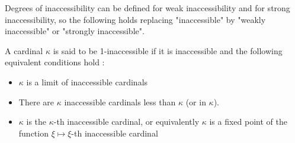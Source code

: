 \documentclass[10pt]{article}
\begin{document}
\begin{comment}
Weakly inaccessible cardinals can be defined using Simmons notation.

Remember this notation :

\( Fix\ f \zeta = f^\omega (\zeta+1) \) is the least fixed point of f that is strictly greater than \( \zeta \).

\( [0] h = Fix (\alpha \mapsto h^\alpha 0) \)

If we define \( Next' = Fix (\xi \mapsto \aleph_\xi) \), then \( Next' \zeta \) is the least fixed point of the function \( \xi \mapsto \aleph_\xi \) which is strictly greater than \( \zeta \). In particular, \( Next' 0 \) is the least (or first) fixed point of \( \xi \mapsto \aleph_\xi \), \( Next' (Next' 0) = Next'^2 0 \) is its second fixed point, and more generally \( Next'^\alpha 0 \) is the \(\alpha\)-th fixed point of \( \xi \mapsto \aleph_\xi \).

\( [0] Next' 0 = Fix (\alpha \mapsto Next'^\alpha 0) 0 \) is the least \( \kappa \) such that \( \kappa = Next'^\kappa 0 = \kappa\)-th fixed point of \( \xi \mapsto \aleph_\xi \), so it is the least (or first) weakly inaccessible cardinal. 

More generally, \( ([0] Next')^\alpha 0 \) is the \(\alpha\)-th weakly inaccessible cardinal.

\bigskip
\end{comment}

Degrees of inaccessibility can be defined for weak inaccessibility and for strong inaccessibility, so the following holds replacing "inaccessible" by "weakly inaccessible" or "strongly inaccessible".

A cardinal \( \kappa \) is said to be 1-inaccessible if it is inaccessible and the following equivalent conditions hold :

\begin{itemize}
     \setlength{\itemsep}{1pt}
     \setlength{\parskip}{0pt}
     \setlength{\parsep}{0pt}

\item \(\kappa\) is a limit of inaccessible cardinals

\item There are \(\kappa\) inaccessible cardinals less than \( \kappa \) (or in \( \kappa \)).

\item \(\kappa\) is the \(\kappa\)-th inaccessible cardinal, or equivalently \(\kappa\) is a fixed point of the function \( \xi \mapsto \xi\)-th inaccessible cardinal

\end{itemize}
\end{document}
